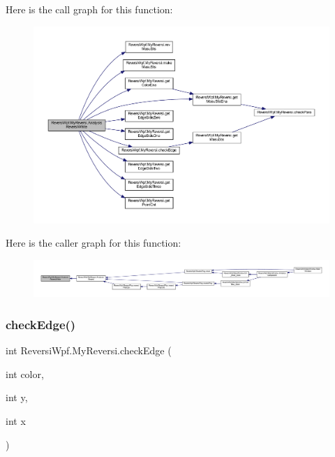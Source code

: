 Here is the call graph for this function\+:\nopagebreak
\begin{figure}[H]
\begin{center}
\leavevmode
\includegraphics[width=350pt]{class_reversi_wpf_1_1_my_reversi_a7be281b0dbae11afb652260b4d30f128_cgraph}
\end{center}
\end{figure}
Here is the caller graph for this function\+:\nopagebreak
\begin{figure}[H]
\begin{center}
\leavevmode
\includegraphics[width=350pt]{class_reversi_wpf_1_1_my_reversi_a7be281b0dbae11afb652260b4d30f128_icgraph}
\end{center}
\end{figure}
\mbox{\label{class_reversi_wpf_1_1_my_reversi_acad9426b5389a91f1f42c733b2f2097e}} 
\subsubsection{\texorpdfstring{check\+Edge()}{checkEdge()}}
{\footnotesize\ttfamily int Reversi\+Wpf.\+My\+Reversi.\+check\+Edge (\begin{DoxyParamCaption}\item[{int}]{color,  }\item[{int}]{y,  }\item[{int}]{x }\end{DoxyParamCaption})}



